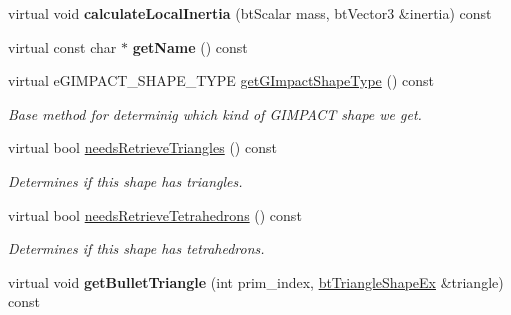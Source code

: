 \begin{DoxyCompactItemize}
\item 
\hypertarget{classbt_g_impact_mesh_shape_part_a06585fb1b18eee79e476c67910baa2ca}{virtual void {\bfseries calculate\+Local\+Inertia} (bt\+Scalar mass, bt\+Vector3 \&inertia) const }\label{classbt_g_impact_mesh_shape_part_a06585fb1b18eee79e476c67910baa2ca}

\item 
\hypertarget{classbt_g_impact_mesh_shape_part_ab18423cc148c3d8b71f9dbd05f9cf1ed}{virtual const char $\ast$ {\bfseries get\+Name} () const }\label{classbt_g_impact_mesh_shape_part_ab18423cc148c3d8b71f9dbd05f9cf1ed}

\item 
virtual e\+G\+I\+M\+P\+A\+C\+T\+\_\+\+S\+H\+A\+P\+E\+\_\+\+T\+Y\+P\+E \hyperlink{classbt_g_impact_mesh_shape_part_a5ff615b55a2bdaeba511fb116a9ab546}{get\+G\+Impact\+Shape\+Type} () const 
\begin{DoxyCompactList}\small\item\em Base method for determinig which kind of G\+I\+M\+P\+A\+C\+T shape we get. \end{DoxyCompactList}\item 
\hypertarget{classbt_g_impact_mesh_shape_part_ab29d963a06904f28296e28490bdc6bc4}{virtual bool \hyperlink{classbt_g_impact_mesh_shape_part_ab29d963a06904f28296e28490bdc6bc4}{needs\+Retrieve\+Triangles} () const }\label{classbt_g_impact_mesh_shape_part_ab29d963a06904f28296e28490bdc6bc4}

\begin{DoxyCompactList}\small\item\em Determines if this shape has triangles. \end{DoxyCompactList}\item 
\hypertarget{classbt_g_impact_mesh_shape_part_a5038802356d83b4897a8d92e9214bbe4}{virtual bool \hyperlink{classbt_g_impact_mesh_shape_part_a5038802356d83b4897a8d92e9214bbe4}{needs\+Retrieve\+Tetrahedrons} () const }\label{classbt_g_impact_mesh_shape_part_a5038802356d83b4897a8d92e9214bbe4}

\begin{DoxyCompactList}\small\item\em Determines if this shape has tetrahedrons. \end{DoxyCompactList}\item 
\hypertarget{classbt_g_impact_mesh_shape_part_a5deaf3963fd7b8c337a322a5d775b478}{virtual void {\bfseries get\+Bullet\+Triangle} (int prim\+\_\+index, \hyperlink{classbt_triangle_shape_ex}{bt\+Triangle\+Shape\+Ex} \&triangle) const }\label{classbt_g_impact_mesh_shape_part_a5deaf3963fd7b8c337a322a5d775b478}


\end{DoxyCompactItemize}
